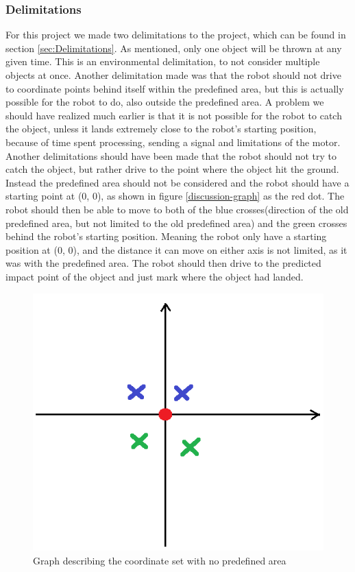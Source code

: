 \subsubsection{Delimitations}
For this project we made two delimitations to the project, which can be found in section \ref{sec:Delimitations}. As mentioned, only one object will be thrown at any given time. This is an environmental delimitation, to not consider multiple objects at once. \newline
Another delimitation made was that the robot should not drive to coordinate points behind itself within the predefined area, but this is actually possible for the robot to do, also outside the predefined area. A problem we should have realized much earlier is that it is not possible for the robot to catch the object, unless it lands extremely close to the robot’s starting position, because of time spent processing, sending a signal and limitations of the motor. Another delimitations should have been made that the robot should not try to catch the object, but rather drive to the point where the object hit the ground. \newline
Instead the predefined area should not be considered and the robot should have a starting point at (0, 0), as shown in figure \ref{discussion-graph} as the red dot. The robot should then be able to move to both of the blue crosses(direction of the old predefined area, but not limited to the old predefined area) and the green crosses behind the robot’s starting position. Meaning the robot only have a starting position at (0, 0), and the distance it can move on either axis is not limited, as it was with the predefined area. The robot should then drive to the predicted impact point of the object and just mark where the object had landed.


\begin{figure}[h]
	\centering
	\includegraphics[scale=0.5]{billeder/discussion-graph.png}
	\caption{Graph describing the coordinate set with no predefined area}
	\label{figure:graph}
\end{figure}



